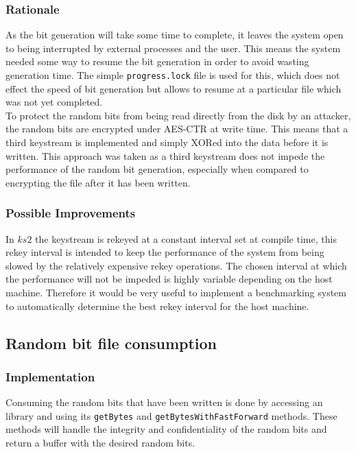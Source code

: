 \documentclass{paper}
\begin{document}
				\subsubsection{Rationale}
					As the bit generation will take some time to complete, it leaves the system open to being interrupted by external processes and the user. This means the system needed some way to resume the bit generation in order to avoid wasting generation time. The simple \texttt{progress.lock} file is used for this, which does not effect the speed of bit generation but allows to resume at a particular file which was not yet completed.\\
					
					To protect the random bits from being read directly from the disk by an attacker, the random bits are encrypted under AES-CTR at write time. This means that a third keystream is implemented and simply XORed into the data before it is written. This approach was taken as a third keystream does not impede the performance of the random bit generation, especially when compared to encrypting the file after it has been written.\\
				\subsubsection{Possible Improvements}
					In $\mathit{ks2}$ the keystream is rekeyed at a constant interval set at compile time, this rekey interval is intended to keep the performance of the system from being slowed by the relatively expensive rekey operations. The chosen interval at which the performance will not be impeded is highly variable depending on the host machine. Therefore it would be very useful to implement a benchmarking system to automatically determine the best rekey interval for the host machine.

			\subsection{Random bit file consumption}
				\subsubsection{Implementation}
					Consuming the random bits that have been written is done by accessing an library and using its \texttt{getBytes} and \texttt{getBytesWithFastForward} methods. These methods will handle the integrity and confidentiality of the random bits and return a buffer with the desired random bits.\\
					
\end{document}
